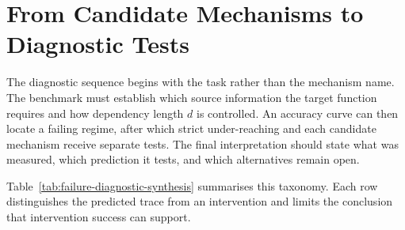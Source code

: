 \section{From Candidate Mechanisms to Diagnostic Tests}

The diagnostic sequence begins with the task rather than the mechanism name.
The benchmark must establish which source information the target function requires and how dependency length $d$ is controlled.
An accuracy curve can then locate a failing regime, after which strict under-reaching and each candidate mechanism receive separate tests.
The final interpretation should state what was measured, which prediction it tests, and which alternatives remain open.

Table~\ref{tab:failure-diagnostic-synthesis} summarises this taxonomy.
Each row distinguishes the predicted trace from an intervention and limits the conclusion that intervention success can support.

